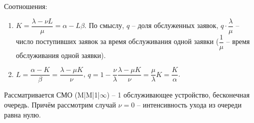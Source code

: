 Соотношения:
\begin{enumerate}
  \item $K = \dfrac{\lambda-\nu L}{\mu} = \alpha - L\beta$.
    По смыслу, $q$ -- доля обслуженных заявок,
    $q\cdot\dfrac{\lambda}{\mu}$ -- число поступивших заявок за время обслуживания одной заявки
    ($\dfrac{1}{\mu}$ -- время обслуживания одной заявки).

  \item $L = \dfrac{\alpha - K}{\beta} = \dfrac{\lambda - \mu K}{\nu}$,
    $q = 1 - \dfrac{\nu}{\lambda} \dfrac{\lambda - \mu K}{\nu} = \dfrac{\mu}{\lambda} K
    = \dfrac{K}{\alpha}$.
\end{enumerate}

\begin{ex}
  Рассматривается СМО (M|M|1|$\infty$) -- 1 обслуживающее устройство, бесконечная очередь.
  Причём рассмотрим случай $\nu = 0$ -- интенсивность ухода из очереди равна нулю.
  \begin{figure}[h!]
    \centering
\end{figure}
\end{ex}
